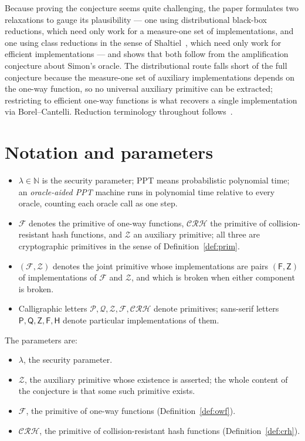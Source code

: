 \documentclass{aicr-conjecture}
\newcommand{\Fc}{\mathcal{F}}
\newcommand{\CRHc}{\mathcal{CRH}}
\newcommand{\Zc}{\mathcal{Z}}
\newcommand{\Pc}{\mathcal{P}}
\newcommand{\Qc}{\mathcal{Q}}
\newcommand{\Fs}{\mathsf{F}}
\newcommand{\Hs}{\mathsf{H}}
\newcommand{\Ps}{\mathsf{P}}
\newcommand{\Qs}{\mathsf{Q}}
\newcommand{\Zs}{\mathsf{Z}}
\begin{document}
Because proving the conjecture seems quite challenging, the paper
formulates two relaxations to gauge its plausibility --- one using
distributional black-box reductions, which need only work for a
measure-one set of implementations, and one using class reductions in the
sense of Shaltiel~\cite{Sha20}, which need only work for efficient
implementations --- and shows that both follow from the amplification
conjecture about Simon's oracle. The distributional route falls short of
the full conjecture because the measure-one set of auxiliary
implementations depends on the one-way function, so no universal
auxiliary primitive can be extracted; restricting to efficient one-way
functions is what recovers a single implementation via Borel--Cantelli.
Reduction terminology throughout follows~\cite{RTV04}.

\section{Notation and parameters}\label{sec:notation}

\begin{itemize}
\item $\lambda\in\mathbb N$ is the security parameter; PPT means
  probabilistic polynomial time; an \emph{oracle-aided PPT} machine runs
  in polynomial time relative to every oracle, counting each oracle call
  as one step.
\item $\Fc$ denotes the primitive of one-way functions, $\CRHc$ the
  primitive of collision-resistant hash functions, and $\Zc$ an auxiliary
  primitive; all three are cryptographic primitives in the sense of
  Definition~\ref{def:prim}.
\item $(\Fc,\Zc)$ denotes the joint primitive whose implementations are
  pairs $(\Fs,\Zs)$ of implementations of $\Fc$ and $\Zc$, and which is
  broken when either component is broken.
\item Calligraphic letters $\Pc,\Qc,\Zc,\Fc,\CRHc$ denote primitives;
  sans-serif letters $\Ps,\Qs,\Zs,\Fs,\Hs$ denote particular
  implementations of them.
\end{itemize}

The parameters are:
\begin{itemize}
\item $\lambda$, the security parameter.
\item $\Zc$, the auxiliary primitive whose existence is asserted; the
  whole content of the conjecture is that some such primitive exists.
\item $\Fc$, the primitive of one-way functions
  (Definition~\ref{def:owf}).
\item $\CRHc$, the primitive of collision-resistant hash functions
  (Definition~\ref{def:crh}).
\end{itemize}
\end{document}
